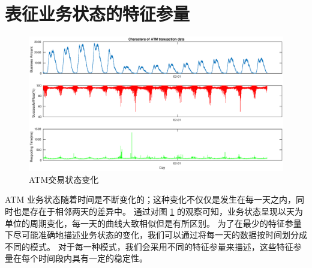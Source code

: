 \documentclass[a4paper]{article}
\begin{document}
\part{表征业务状态的特征参量}
\begin{figure}[htbp]
	\centering
	\includegraphics[scale=0.4]{pic/jan-feb-bsr.eps}
	\caption{ATM交易状态变化}
     \label{fig:char}
\end{figure}
ATM 业务状态随着时间是不断变化的；这种变化不仅仅是发生在每一天之内，同时也是存在于相邻两天的差异中。
通过对图 \ref{fig:char} 的观察可知，业务状态呈现以天为单位的周期变化，每一天的曲线大致相似但是有所区别。
为了在最少的特征参量下尽可能准确地描述业务状态的变化，我们可以通过将每一天的数据按时间划分成不同的模式。
对于每一种模式，我们会采用不同的特征参量来描述，这些特征参量在每个时间段内具有一定的稳定性。
\\
\end{document}
